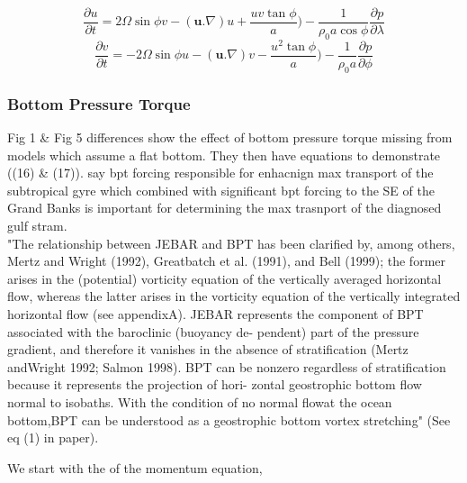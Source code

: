 \documentclass[..\EOYR.tex]{subfiles}
\begin{document}
\begin{equation} \label{PrimMomUGV}
    \frac{\partial u}{\partial t}=2\Omega\sin\phi v - (\mathbf{u}.\nabla)u + \frac{uv\tan \phi }{a}) - \frac{1}{\rho_0 a \cos \phi}\frac{\partial p}{\partial \lambda}
\end{equation}
\begin{equation} \label{PrimMomVGV}
    \frac{\partial v}{\partial t}=-2\Omega\sin\phi u - (\mathbf{u}.\nabla)v - \frac{u^2\tan \phi }{a}) - \frac{1}{\rho_0 a}\frac{\partial p}{\partial \phi}
\end{equation}





\subsubsection*{Bottom Pressure Torque}
\citep{Greatbatch1991} Fig 1 \& Fig 5 differences show the effect of bottom pressure torque missing from models which assume a flat bottom. They then have equations to demonstrate ((16) \& (17)). \citep{Greatbatch1991} say bpt forcing responsible for enhacnign max transport of the subtropical gyre which combined with significant bpt forcing to the SE of the Grand Banks is important for determining the max trasnport of the diagnosed gulf stram. \\
\citep{Yeager2015} "The relationship between JEBAR and BPT has been clarified by, among others, Mertz and Wright (1992), Greatbatch et al. (1991), and Bell (1999); the former arises in the (potential) vorticity equation of the vertically averaged horizontal flow, whereas the latter arises in the vorticity equation of the vertically integrated horizontal flow (see appendixA). JEBAR represents the component of BPT associated with the baroclinic (buoyancy de- pendent) part of the pressure gradient, and therefore it vanishes in the absence of stratification (Mertz andWright 1992; Salmon 1998). BPT can be nonzero regardless of stratification because it represents the projection of hori- zontal geostrophic bottom flow normal to isobaths. With the condition of no normal flowat the ocean bottom,BPT can be understood as a geostrophic bottom vortex stretching" (See eq (1) in paper).

We start with the  of the momentum equation,
\begin{equation}\label{momentum}
\end{equation}
\end{document}
